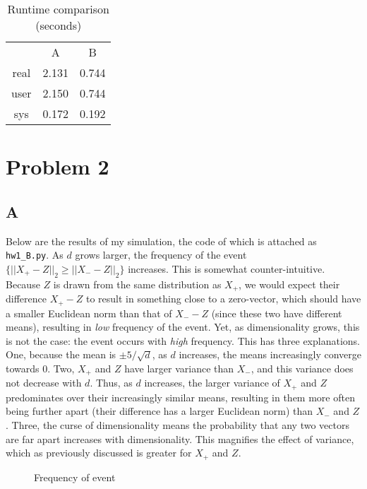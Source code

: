 \documentclass{article}
\begin{document}
\begin{center}
	\begin{table}[h]
		\centering
		\caption{Runtime comparison (seconds)}
		\begin{tabular}{|c c c|}
			\hline
			& A & B \\
			real & 2.131 & 0.744\\
			user & 2.150 & 0.744\\
			sys  & 0.172 & 0.192\\
			\hline
		\end{tabular}
	\end{table}
\end{center}



\section*{Problem 2}

\subsection*{A}

Below are the results of my simulation, the code of which is attached as
\texttt{hw1\_B.py}. As $d$ grows larger, the frequency of the event $\{||X_+ -
Z||_2 \geq ||X_{-} - Z||_2\}$ increases. This is somewhat counter-intuitive.
Because $Z$ is drawn from the same distribution as $X_+$, we would expect their
difference $X_+ - Z$ to result in something close to a zero-vector, which should
have a smaller Euclidean norm than that of $X_- - Z$
(since these two have different
means), resulting in \textit{low}
frequency of the event. Yet, as dimensionality grows,
this is not the case: the event occurs with \textit{high} frequency. This has three
explanations. One, because the mean is $\pm 5/\sqrt{d}$, as $d$ increases, the
means increasingly converge towards 0. Two, $X_+$ and $Z$ have larger variance than
$X_-$, and this variance does not decrease with $d$. Thus, as $d$ increases, the
larger variance of $X_+$ and $Z$ predominates over their increasingly similar
means, resulting in them more often being further apart (their difference has a
larger Euclidean norm) than $X_-$ and $Z$. Three, the curse of dimensionality
means the probability that any two vectors are far apart increases with
dimensionality. This magnifies the effect of variance, which as previously
discussed is greater for $X_+$ and $Z$.

\begin{figure}[h!]
	\centering
	\caption{Frequency of event}
\end{figure}
\end{document}
